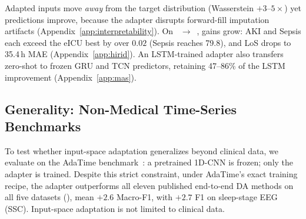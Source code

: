 Adapted inputs move \emph{away} from the target distribution (Wasserstein $+3$--$5\times$) yet predictions improve, because the adapter disrupts forward-fill imputation artifacts (Appendix~\ref{app:interpretability}). On \hirid{}~$\to$~\mimic{}, gains grow: AKI and Sepsis each exceed the eICU best by over $0.02$ \aucroc{} (Sepsis reaches 79.8), and LoS drops to 35.4\,h MAE (Appendix~\ref{app:hirid}). An LSTM-trained adapter also transfers zero-shot to frozen GRU and TCN predictors, retaining 47--86\% of the LSTM improvement (Appendix~\ref{app:mas}).

\subsection{Generality: Non-Medical Time-Series Benchmarks}
\label{sec:adatime}

To test whether input-space adaptation generalizes beyond clinical data, we evaluate on the AdaTime benchmark~\citep{ragab2023adatime}: a pretrained 1D-CNN is frozen; only the adapter is trained.
Despite this strict constraint, under AdaTime's exact training recipe, the adapter outperforms all eleven published end-to-end DA methods on all five datasets (), mean $+2.6$ Macro-F1, with $+2.7$ F1 on sleep-stage EEG (SSC). Input-space adaptation is not limited to clinical data.
